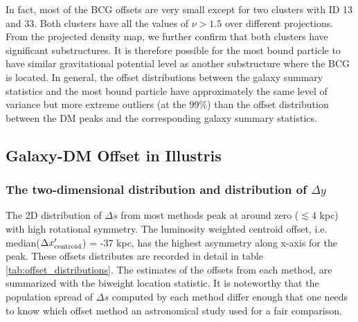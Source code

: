 In fact, most of the BCG offsets are very small except for two clusters with ID 13
and 33. Both clusters have all the values  of $\nu > 1.5 $ over different projections. 
From the projected density map, we further confirm that
both clusters have significant substructures. It is therefore possible for the
most bound particle to have similar gravitational potential level as another 
substructure where the BCG is located. 
In general, the offset distributions between the galaxy summary statistics and
the most bound particle have approximately the same level of variance but more
extreme outliers (at the 99\%) than the
offset distribution between the DM peaks and the corresponding galaxy summary
statistics.

\subsection{Galaxy-DM Offset in Illustris}
\subsubsection{The two-dimensional distribution and distribution of $\Delta y$}
The 2D distribution of $\Delta s$ from most methods peak at
around zero ($\lesssim 4$ kpc) with high rotational symmetry. 
The luminosity weighted centroid offset, i.e. median($\Delta x_{\rm
centroid}'$) = -37 kpc, has the highest asymmetry along x-axis for the peak.
These offsets distributes are recorded in detail in table
\ref{tab:offset_distributions}. The estimates of the offsets from each method, 
are summarized with the biweight location statistic.
It is noteworthy that the population spread of $\Delta s$ computed by each method 
differ enough that one needs to know which offset method an astronomical study
used for a fair comparison. 

